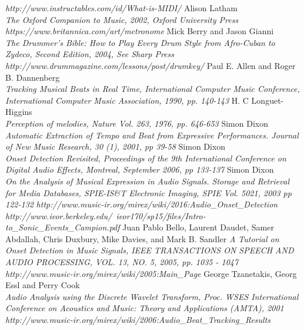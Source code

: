 \documentclass[a4paper, 11pt]{article}
\begin{document}
\newpage
\begin{thebibliography}{99}
\textit{http://www.instructables.com/id/What-is-MIDI/}
Alison Latham\\
\textit{The Oxford Companion to Music, 2002, Oxford University Press}
\textit{https://www.britannica.com/art/metronome}
Mick Berry and Jason Gianni\\
\textit{The Drummer's Bible: How to Play Every Drum Style from Afro-Cuban to Zydeco, Second Edition, 2004, See Sharp Press}
\textit{http://www.drummagazine.com/lessons/post/drumkey/}
Paul E. Allen and Roger B. Dannenberg\\
\textit{Tracking Musical Beats in Real Time, International Computer Music Conference, International Computer Music Association, 1990, pp. 140-143}
H. C Longuet-Higgins\\
\textit{Perception of melodies, Nature Vol. 263, 1976, pp. 646-653}
Simon Dixon\\
\textit{Automatic Extraction of Tempo and Beat from Expressive Performances. Journal of New Music Research, 30 (1), 2001, pp 39-58}
Simon Dixon\\
\textit{Onset Detection Revisited, Proceedings of the 9th International Conference on Digital Audio Effects, Montreal, September 2006, pp 133-137}
Simon Dixon\\
\textit{On the Analysis of Musical Expression in Audio Signals. Storage and Retrieval for Media Databases, SPIE-IS\&T Electronic Imaging, SPIE Vol. 5021, 2003 pp 122-132}
\textit{http://www.music-ir.org/mirex/wiki/2016:Audio\_Onset\_Detection}
\textit{http://www.ieor.berkeley.edu/~ieor170/sp15/files/Intro-to\_Sonic\_Events\_Campion.pdf}
Juan Pablo Bello, Laurent Daudet, Samer Abdallah, Chris Duxbury, Mike Davies, and Mark B. Sandler 
\textit{A Tutorial on Onset Detection in Music Signals, IEEE TRANSACTIONS ON SPEECH AND AUDIO PROCESSING, VOL. 13, NO. 5, 2005, pp. 1035 - 1047}
\textit{http://www.music-ir.org/mirex/wiki/2005:Main\_Page}
George Tzanetakis, Georg Essl and Perry Cook\\
\textit{Audio Analysis using the Discrete Wavelet Transform, Proc. WSES International Conference on Acoustics and Music: Theory and Applications (AMTA), 2001}
\textit{http://www.music-ir.org/mirex/wiki/2006:Audio\_Beat\_Tracking\_Results}

\end{thebibliography}
\end{document}
